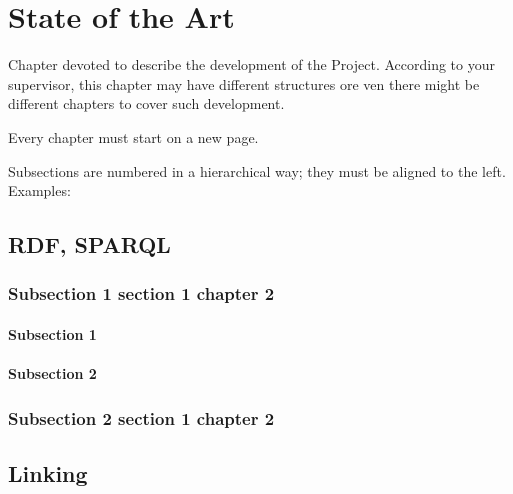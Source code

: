 \chapter{State of the Art}
Chapter devoted to describe the development of the Project. According to your supervisor, this chapter may have different structures ore ven there might be different chapters to cover such development.

Every chapter must start on a new page.

Subsections are numbered in a hierarchical way; they must be aligned to the left. Examples:


\section{RDF, SPARQL}

\subsection{Subsection 1 section 1 chapter 2}

\subsubsection{Subsection 1}

\subsubsection{Subsection 2}

\subsection{Subsection 2 section 1 chapter 2}

\section{Linking}

